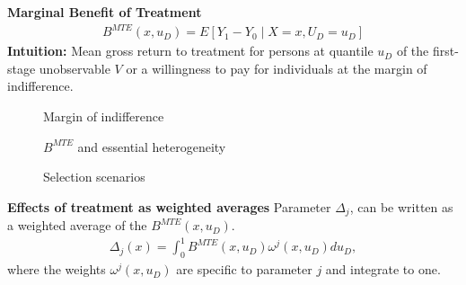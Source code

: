 \begin{frame}\textbf{Marginal Benefit of Treatment}
	\begin{align*}
		B^{MTE}(x, u_D) = E [Y_1 - Y_0 \mid X = x,  U_D = u_D]
	\end{align*}
	\textbf{Intuition:} Mean gross return to treatment for persons at
	quantile \(u_D\) of the first-stage unobservable \(V\) or a willingness to pay for individuals at the margin of indifference.
\end{frame}
\begin{frame}
	\begin{figure}\caption{Margin of indifference}
	\end{figure}
\end{frame}
\begin{frame}
\begin{figure}\caption{$B^{MTE}$ and essential heterogeneity}
	\end{figure}
\end{frame}
\begin{frame}
	\begin{figure}\caption{Selection scenarios}
	\end{figure}
\end{frame}
\begin{frame}
	\textbf{Effects of treatment as weighted averages}
	Parameter \(\Delta_j\), can be written as a weighted average of the
	\(B^{MTE}(x, u_D)\).
	\begin{align*}
		\Delta_j(x) = \int_0^1 B^{MTE}(x, u_D) \omega^j(x, u_D) du_D,
	\end{align*}
	where the weights \(\omega^j(x, u_D)\) are specific to parameter \(j\)
	and integrate to one.
\end{frame}
